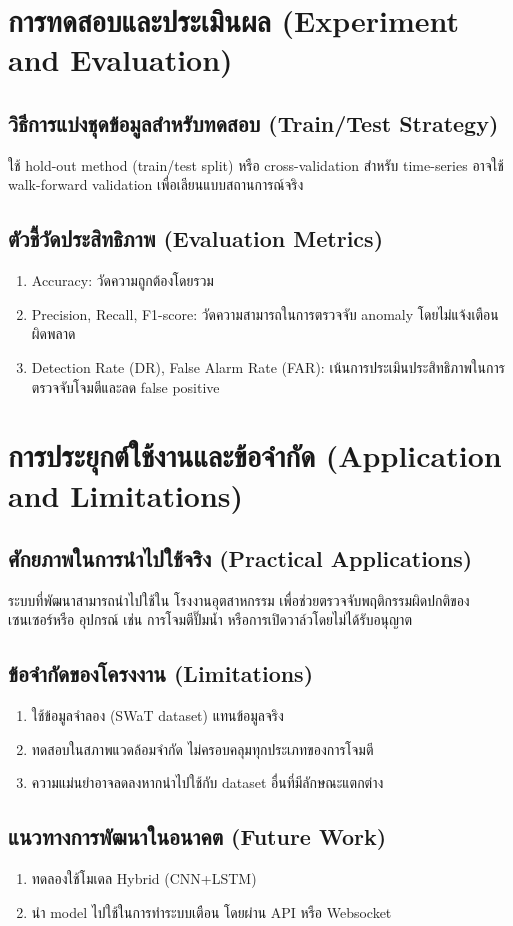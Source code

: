 \section{การทดสอบและประเมินผล (Experiment and Evaluation)}

\subsection{วิธีการแบ่งชุดข้อมูลสำหรับทดสอบ (Train/Test Strategy)}
\hspace{2em} ใช้ hold-out method (train/test split) หรือ cross-validation สำหรับ time-series อาจใช้ walk-forward validation เพื่อเลียนแบบสถานการณ์จริง

\subsection{ตัวชี้วัดประสิทธิภาพ (Evaluation Metrics)}
\begin{enumerate}
  \item Accuracy: วัดความถูกต้องโดยรวม
  \item Precision, Recall, F1-score: วัดความสามารถในการตรวจจับ anomaly โดยไม่แจ้งเตือนผิดพลาด
  \item Detection Rate (DR), False Alarm Rate (FAR): เน้นการประเมินประสิทธิภาพในการตรวจจับโจมตีและลด false positive
\end{enumerate}

\section{การประยุกต์ใช้งานและข้อจำกัด (Application and Limitations)}
\subsection{ศักยภาพในการนำไปใช้จริง (Practical Applications)}
\hspace{2em} ระบบที่พัฒนาสามารถนำไปใช้ใน โรงงานอุตสาหกรรม เพื่อช่วยตรวจจับพฤติกรรมผิดปกติของเซนเซอร์หรือ อุปกรณ์ เช่น การโจมตีปั๊มน้ำ หรือการเปิดวาล์วโดยไม่ได้รับอนุญาต

\subsection{ข้อจำกัดของโครงงาน (Limitations)}
\begin{enumerate}
  \item ใช้ข้อมูลจำลอง (SWaT dataset) แทนข้อมูลจริง
  \item ทดสอบในสภาพแวดล้อมจำกัด ไม่ครอบคลุมทุกประเภทของการโจมตี
  \item ความแม่นยำอาจลดลงหากนำไปใช้กับ dataset อื่นที่มีลักษณะแตกต่าง
\end{enumerate}

\subsection{แนวทางการพัฒนาในอนาคต (Future Work)}
\begin{enumerate}
  \item ทดลองใช้โมเดล Hybrid (CNN+LSTM)
  \item นำ model ไปใช้ในการทำระบบเตือน โดยผ่าน API หรือ Websocket
\end{enumerate}